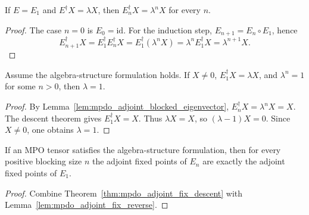 \begin{lemma}%
    \label{lem:mpdo_adjoint_blocked_eigenvector}
    \leanok
    If $E=E_1$ and $E^\dagger X=\lambda X$, then
    $E_n^\dagger X=\lambda^n X$ for every $n$.
\end{lemma}
\begin{proof}\leanok
    The case $n=0$ is $E_0=\mathrm{id}$. For the induction step,
    $E_{n+1}=E_n\circ E_1$, hence
    \[
        E_{n+1}^{\dagger}X
        = E_1^{\dagger}E_n^{\dagger}X
        = E_1^{\dagger}(\lambda^n X)
        = \lambda^n E_1^{\dagger}X
        = \lambda^{n+1}X.
    \]
\end{proof}

\begin{theorem}%
    \label{thm:mpdo_algebra_root_of_unity_eigenvalue}
    \leanok
    Assume the algebra-structure formulation holds. If $X\ne 0$,
    $E_1^\dagger X=\lambda X$, and $\lambda^n=1$ for some $n>0$, then
    $\lambda=1$.
\end{theorem}
\begin{proof}\leanok
    By Lemma~\ref{lem:mpdo_adjoint_blocked_eigenvector},
    $E_n^\dagger X=\lambda^n X=X$. The descent theorem gives
    $E_1^\dagger X=X$. Thus $\lambda X=X$, so $(\lambda-1)X=0$. Since
    $X\ne0$, one obtains $\lambda=1$.
\end{proof}

\begin{theorem}%
    \label{thm:mpdo_adjoint_fix_equality_from_algebra}
    \leanok
    If an MPO tensor satisfies the algebra-structure formulation, then for
    every positive blocking size $n$ the adjoint fixed points of $E_n$ are
    exactly the adjoint fixed points of $E_1$.
\end{theorem}
\begin{proof}\leanok
    Combine Theorem~\ref{thm:mpdo_adjoint_fix_descent} with
    Lemma~\ref{lem:mpdo_adjoint_fix_reverse}.
\end{proof}

